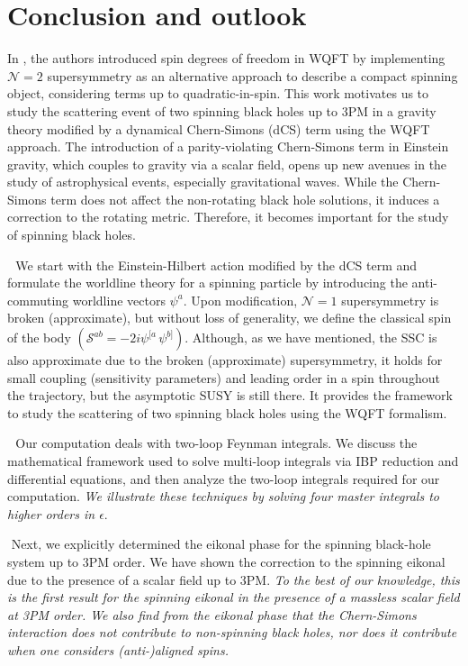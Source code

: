 \section{Conclusion and outlook}\label{con}
In \cite{Jakobsen:2021zvh}, the authors introduced spin degrees of freedom in WQFT by implementing  $\mathcal{N}=2$ supersymmetry as an alternative approach to describe a compact spinning object, considering terms up to quadratic-in-spin. This work motivates us to study the scattering event of two spinning black holes up to $3$PM in a gravity theory modified by a dynamical Chern-Simons (dCS) term using the WQFT approach. %
The introduction of a parity-violating Chern-Simons term in Einstein gravity, which couples to gravity via a scalar field, opens up new avenues in the study of astrophysical events, especially gravitational waves. While the Chern-Simons term does not affect the non-rotating black hole solutions, it induces a correction to the rotating metric. Therefore, it becomes important for the study of spinning black holes. 

\textbullet$\,\,$ We start with the Einstein-Hilbert action modified by the dCS term and formulate the worldline theory for a spinning particle by introducing the anti-commuting worldline vectors $\psi^{a}$. Upon modification, $\mathcal{N}=1$  supersymmetry is broken (approximate), but without loss of generality, we define the classical spin of the body $(\mathcal{S}^{ab}=-2i\psi^{[a}\,\psi^{b]})$. Although, as we have mentioned, the SSC is also approximate due to the broken (approximate) supersymmetry, it holds for small coupling (sensitivity parameters) and leading order in a spin throughout the trajectory, but the asymptotic SUSY is still there. It provides the framework to study the scattering of two spinning black holes using the WQFT formalism. 

\textbullet $\,\,$ Our computation deals with two-loop Feynman integrals. We discuss the mathematical framework \cite{Dlapa:2023hsl,Henn:2014qga} used to solve multi-loop integrals via IBP reduction and differential equations, and then analyze the two-loop integrals required for our computation. \textit{We illustrate these techniques by solving \textit{four} master integrals to higher orders in $\epsilon$}.

\textbullet$\,\,$Next, we explicitly determined the eikonal phase for the spinning black-hole system up to 3PM order. We have shown the correction to the spinning eikonal due to the presence of a scalar field up to 3PM. \textit{To the best of our knowledge, this is the first result for the spinning eikonal in the presence of a massless scalar field at 3PM order. We also find from the eikonal phase that the Chern-Simons interaction does not contribute to non-spinning black holes, nor does it contribute when one considers (anti-)aligned spins.}

